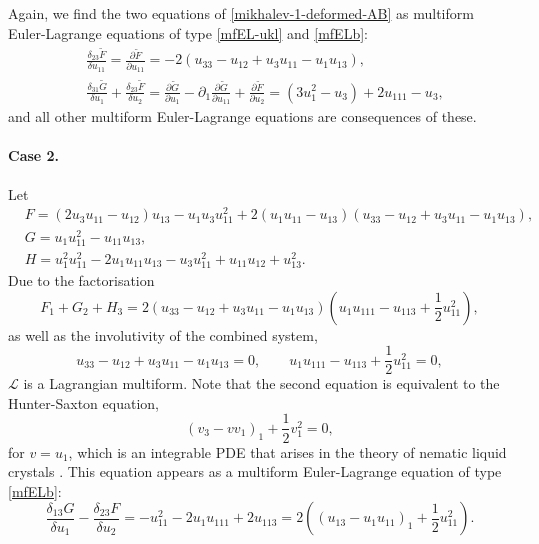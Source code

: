 \documentclass[12pt, a4paper]{article}
\theoremstyle{definition}
\newcommand{\cL}{\mathcal{L}}
\newcommand{\var}[3]{\frac{\delta_{#1} #2}{\delta #3}}
\newcommand{\der}[2]{\frac{\partial #1}{\partial #2}}
\begin{document}
Again, we find the two equations of \eqref{mikhalev-1-deformed-AB} as multiform Euler-Lagrange equations of type \eqref{mfEL-ukl} and \eqref{mfELb}:
\begin{align*}
	& \var{23}{\tilde F}{u_{11}} = \der{\tilde F}{u_{11}} = -2(u_{33}-u_{12}+ u_3 u_{11}-u_1u_{13}) , \\
	& \var{31}{\tilde G}{u_1} + \var{23}{\tilde F}{u_2} = \der{\tilde G}{u_{1}} - \partial_1 \der{\tilde G}{u_{11}} + \der{\tilde F}{u_2} 
	= (3 u_1^2 - u_3) + 2 u_{111} - u_3,
\end{align*}
and all other multiform Euler-Lagrange equations are consequences of these.



\paragraph{Case 2.} Let
\begin{align*}
& F=(2u_3u_{11}-u_{12})u_{13}-u_1u_3u_{11}^2+2(u_1u_{11}-u_{13})(u_{33}-u_{12}+u_3u_{11}-u_1u_{13}), \\
& G=u_1u_{11}^2-u_{11}u_{13}, \\ & H=u_1^2u_{11}^2-2u_1u_{11}u_{13}-u_3u_{11}^2+u_{11}u_{12}+u_{13}^2.
\end{align*}
Due to the factorisation
$$
F_1+G_2+H_3 = 2 \left(u_{33}-u_{12}+u_3u_{11}-u_1u_{13} \right) \left( u_1u_{111}-u_{113}+\frac{1}{2}u_{11}^2 \right),
$$
as well as the involutivity of  the combined system,
$$
u_{33}-u_{12}+u_3u_{11}-u_1u_{13}=0, \qquad u_1u_{111}-u_{113}+\frac{1}{2}u_{11}^2=0,
$$
$\cL$ is a Lagrangian multiform. Note that the second equation is equivalent to the Hunter-Saxton equation, 
\[ (v_3-vv_1)_1+\frac{1}{2}v_1^2=0,\]
for $v=u_1$, which is an integrable PDE that arises in the theory of nematic liquid crystals \cite{hunter1991dynamics}.
This equation appears as a multiform Euler-Lagrange equation of type \eqref{mfELb}:
\[ \var{13}{G}{u_1} - \var{23}{F}{u_2} = -u_{11}^2 - 2 u_1 u_{111} + 2 u_{113}
	= 2\left( (u_{13}-u_1u_{11})_1+\frac{1}{2}u_{11}^2 \right).
\]
\end{document}
